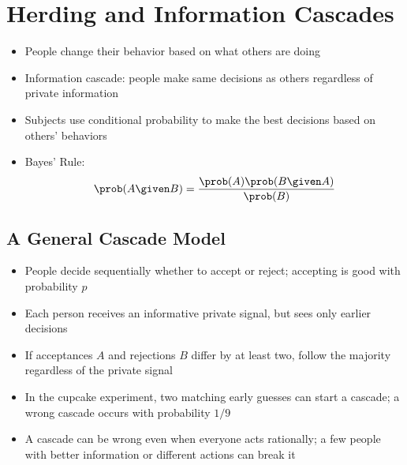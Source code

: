 \chapter{Herding and Information Cascades}

\begin{itemize}
    \item People change their behavior based on what others are doing
    \item Information cascade: people make same decisions as others regardless of private information
    \item Subjects use conditional probability to make the best decisions based on others' behaviors
    \item Bayes' Rule:
          \begin{equation}
              \prob(A \given B) = \frac{\prob(A) \prob(B \given A)}{\prob(B)}
          \end{equation}
\end{itemize}

\section{A General Cascade Model}

\begin{itemize}
    \item People decide sequentially whether to accept or reject; accepting is good with probability \(p\)
    \item Each person receives an informative private signal, but sees only earlier decisions
    \item If acceptances \(A\) and rejections \(B\) differ by at least two, follow the majority regardless of the private signal
    \item In the cupcake experiment, two matching early guesses can start a cascade; a wrong cascade occurs with probability \(1/9\)
    \item A cascade can be wrong even when everyone acts rationally; a few people with better information or different actions can break it
\end{itemize}
